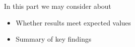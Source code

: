 In this part we may consider about
\begin{itemize}
    \item Whether results meet expected values
    \item Summary of key findings
\end{itemize}